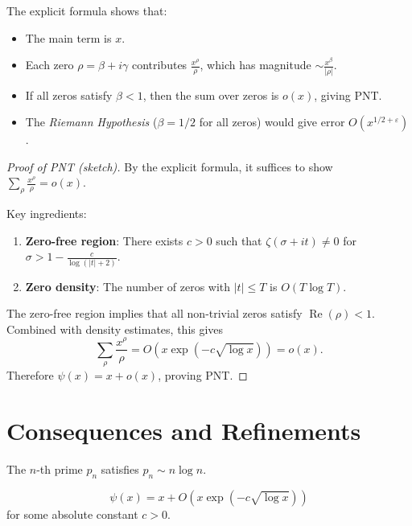 \begin{remark}
  The explicit formula shows that:
  \begin{itemize}
    \item The main term is $x$.
    \item Each zero $\rho = \beta + i\gamma$ contributes $\frac{x^\rho}{\rho}$, which has magnitude $\sim \frac{x^\beta}{|\rho|}$.
    \item If all zeros satisfy $\beta < 1$, then the sum over zeros is $o(x)$, giving PNT.
    \item The \emph{Riemann Hypothesis} ($\beta = 1/2$ for all zeros) would give error $O(x^{1/2 + \varepsilon})$.
  \end{itemize}
\end{remark}

\begin{proof}[Proof of PNT (sketch)]
  By the explicit formula, it suffices to show $\sum_\rho \frac{x^\rho}{\rho} = o(x)$.

  Key ingredients:
  \begin{enumerate}
    \item \textbf{Zero-free region}: There exists $c > 0$ such that $\zeta(\sigma + it) \neq 0$ for $\sigma > 1 - \frac{c}{\log(|t| + 2)}$.
    \item \textbf{Zero density}: The number of zeros with $|t| \leq T$ is $O(T \log T)$.
  \end{enumerate}

  The zero-free region implies that all non-trivial zeros satisfy $\operatorname{Re}(\rho) < 1$. Combined with density estimates, this gives
  \begin{equation}
    \sum_\rho \frac{x^\rho}{\rho} = O\left(x \exp\left(-c\sqrt{\log x}\right)\right) = o(x).
  \end{equation}
  Therefore $\psi(x) = x + o(x)$, proving PNT.
\end{proof}

\section{Consequences and Refinements}

\begin{corollary}
  The $n$-th prime $p_n$ satisfies $p_n \sim n \log n$.
\end{corollary}

\begin{theorem}
  \begin{equation}
    \psi(x) = x + O\left(x \exp\left(-c\sqrt{\log x}\right)\right)
  \end{equation}
  for some absolute constant $c > 0$.
\end{theorem}

